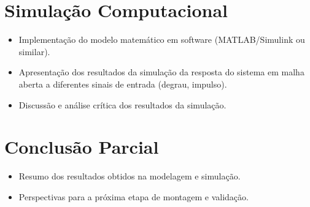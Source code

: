 \documentclass[9pt,a4paper,twocolumn,twoside]{tau-class/tau}
\begin{document}
\section{Simulação Computacional}
\begin{itemize}
    \item Implementação do modelo matemático em software (MATLAB/Simulink ou similar).
    \item Apresentação dos resultados da simulação da resposta do sistema em malha aberta a diferentes sinais de entrada (degrau, impulso).
    \item Discussão e análise crítica dos resultados da simulação.
\end{itemize}

\section{Conclusão Parcial}
\begin{itemize}
    \item Resumo dos resultados obtidos na modelagem e simulação.
    \item Perspectivas para a próxima etapa de montagem e validação.
\end{itemize}


    
    
    
    


\printbibliography

\end{document}
